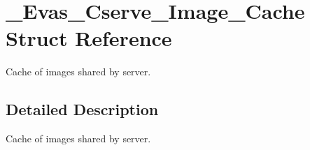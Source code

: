 \section{\_\-Evas\_\-Cserve\_\-Image\_\-Cache Struct Reference}
\label{struct__Evas__Cserve__Image__Cache}


Cache of images shared by server.  




\subsection{Detailed Description}
Cache of images shared by server. 